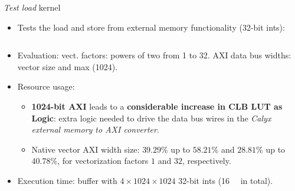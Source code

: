 \documentclass[8pt,a4paper,oneside,hidelinks,aspectratio=169,dvipsnames]{beamer}
\begin{document}
\begin{frame}{\textit{Test load} kernel}
  \begin{itemize}
    \item Tests the load and store from external memory functionality (32-bit ints):
          \begin{figure}[H]
            \centering
            \begin{minipage}{0.3\textwidth}
              \inputminted[tabsize=2,frame=single,rulecolor=gray,fontsize=\fontsize{5}{5}]{cpp}{fig/test_load_kernel.cpp}
            \end{minipage}
          \end{figure}
    \item Evaluation: vect. factors: powers of two from 1 to 32. AXI data bus widths: vector size and max (1024).
    \item Resource usage:
          \begin{table}[Ht]
            \makebox[\linewidth]{
              \scalebox{.333}{}
              \scalebox{.333}{}
              \scalebox{.333}{}
            }
          \end{table}
          \begin{itemize}
            \item \textbf{1024-bit AXI} leads to a \textbf{considerable increase in CLB LUT as Logic}: extra logic needed to drive the data bus wires in the \textit{Calyx external memory to AXI converter}.
            \item Native vector AXI width size: $39.29\%$ up to $58.21\%$ and $28.81\%$ up to $40.78\%$, for vectorization factors $1$ and $32$, respectively.
          \end{itemize}
    \item Execution time: buffer with $4 \times 1024 \times 1024$ 32-bit ints (\qty{16}{\mega\byte} in total).
          \begin{table}[H]
            \centering
            \scalebox{.333}{}
          \end{table}
  \end{itemize}
\end{frame}
\end{document}
